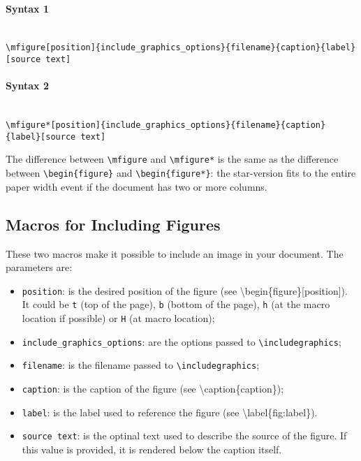\documentclass[book,taskpackage,specpackage,codepackage]{upmethodology-document}
\begin{document}
\paragraph{Syntax 1} \mbox{}\\
\texttt{{\textbackslash}mfigure[position]\{include\_graphics\_options\}\{filename\}\{caption\}\{label\}[source text]}

\paragraph{Syntax 2} \mbox{}\\
\texttt{{\textbackslash}mfigure*[position]\{include\_graphics\_options\}\{filename\}\{caption\}\{label\}[source text]}

The difference between \texttt{{\textbackslash}mfigure} and \texttt{{\textbackslash}mfigure*} is the same as the difference between \texttt{{\textbackslash}begin\{figure\}} and \texttt{{\textbackslash}begin\{figure*\}}: the star-version fits to the entire paper width event if the document has two or more columns.

\subsection{Macros for Including Figures}

These two macros make it possible to include an image in your document. The parameters are:
\begin{itemize}
\item \texttt{position}: is the desired position of the figure (see {\textbackslash}begin\{figure\}[position]). It could be \texttt{t} (top of the page), \texttt{b} (bottom of the page), \texttt{h} (at the macro location if possible) or \texttt{H} (at macro location);

\item \texttt{include\_graphics\_options}: are the options passed to \texttt{{\textbackslash}includegraphics};

\item \texttt{filename}: is the filename passed to \texttt{{\textbackslash}includegraphics};

\item \texttt{caption}: is the caption of the figure (see {\textbackslash}caption\{caption\});

\item \texttt{label}: is the label used to reference the figure (see {\textbackslash}label\{fig:label\}).

\item \texttt{source text}: is the optinal text used to describe the source of the figure. If this value is provided, it is rendered below the caption itself.
\end{itemize}
\end{document}

